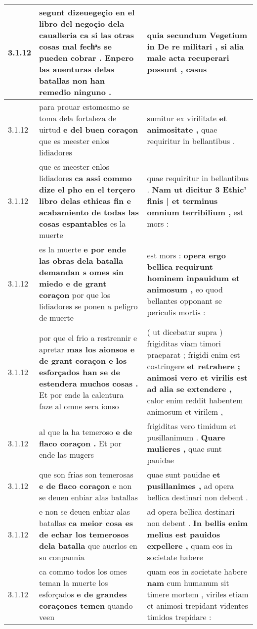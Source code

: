\begin{tabular}{|p{1cm}|p{6.5cm}|p{6.5cm}|}
3.1.12 & segunt dizeuegeçio en el libro del negoçio dela caualleria \textbf{ ca si las otras cosas mal fechͣs se pueden cobrar . } Enpero las auenturas delas batallas non han remedio ninguno . & quia secundum Vegetium in De re militari , \textbf{ si alia male acta recuperari possunt , } casus \\\hline
3.1.12 & para prouar estomesmo se toma dela fortaleza de uirtud \textbf{ e del buen coraçon } que es meester enlos lidiadores & sumitur ex virilitate \textbf{ et animositate , } quae requiritur in bellantibus . \\\hline
3.1.12 & que es meester enlos lidiadores \textbf{ ca assi commo dize el pho en el terçero libro delas ethicas fin e acabamiento de todas las cosas espantables } es la muerte & quae requiritur in bellantibus . \textbf{ Nam ut dicitur 3 Ethic’ finis | et terminus omnium terribilium , } est mors : \\\hline
3.1.12 & es la muerte \textbf{ e por ende las obras dela batalla demandan s omes sin miedo e de grant coraçon } por que los lidiadores se ponen a peligro de muerte & est mors : \textbf{ opera ergo bellica requirunt hominem inpauidum et animosum , } eo quod bellantes opponant se periculis mortis : \\\hline
3.1.12 & por que el frio a restrennir e apretar \textbf{ mas los aionsos e de grant coraçon e los esforçados han se de estendera muchos cosas . } Et por ende la calentura faze al omne sera ionso & ( ut dicebatur supra ) frigiditas viam timori praeparat ; frigidi enim est costringere \textbf{ et retrahere ; animosi vero et virilis est ad alia se extendere , } calor enim reddit habentem animosum et virilem , \\\hline
3.1.12 & al que la ha temeroso \textbf{ e de flaco coraçon . } Et por ende las mugers & frigiditas vero timidum et pusillanimum . \textbf{ Quare mulieres , } quae sunt pauidae \\\hline
3.1.12 & que son frias son temerosas \textbf{ e de flaco coraçon } e non se deuen enbiar alas batallas & quae sunt pauidae \textbf{ et pusillanimes , } ad opera bellica destinari non debent . \\\hline
3.1.12 & e non se deuen enbiar alas batallas \textbf{ ca meior cosa es de echar los temerosos dela batalla } que auerlos en su conpannia & ad opera bellica destinari non debent . \textbf{ In bellis enim melius est pauidos expellere , } quam eos in societate habere \\\hline
3.1.12 & ca commo todos los omes teman la muerte los esforçados \textbf{ e de grandes coraçones temen } quando veen & quam eos in societate habere \textbf{ nam } cum humanum sit timere mortem , viriles etiam et animosi trepidant videntes timidos trepidare : \\\hline

\end{tabular}
